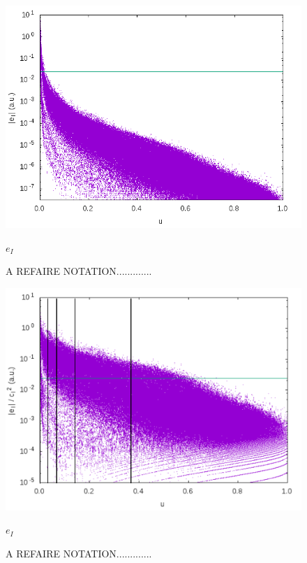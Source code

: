 \documentclass[./thesis.tex]{subfiles}
\begin{document}
\begin{figure}[h!]
	\begin{center}
		\includegraphics[width=0.9\columnwidth]{figures/pt2/eI}
		\caption{A REFAIRE NOTATION.............}
		\label{fig:ei}
		$e_I$
	\end{center}
\end{figure}

\begin{figure}[h!]
	\begin{center}
		\includegraphics[width=0.9\columnwidth]{figures/pt2/eici2comb}
		\caption{A REFAIRE NOTATION.............}
		\label{fig:eici2comb}
		$e_I$
	\end{center}
\end{figure}
\end{document}
